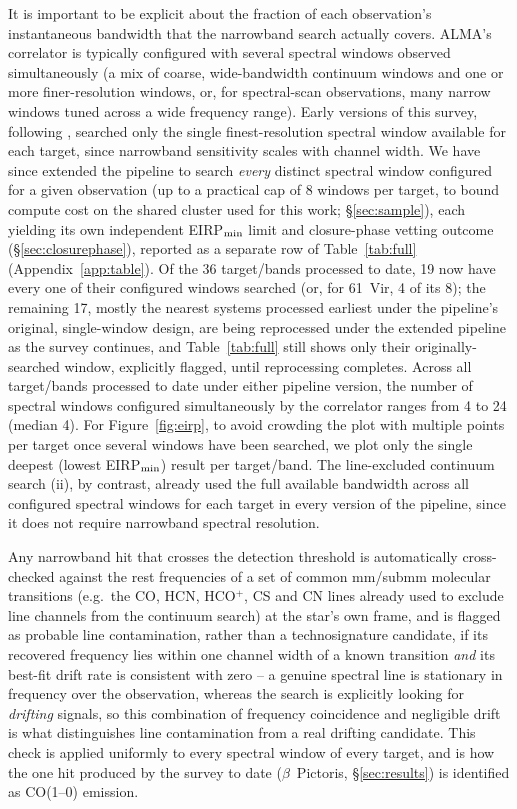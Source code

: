 \documentclass{openjournal}
\begin{document}
It is important to be explicit about the fraction of each observation's
instantaneous bandwidth that the narrowband search actually covers.
ALMA's correlator is typically configured with several spectral windows
observed simultaneously (a mix of coarse, wide-bandwidth continuum
windows and one or more finer-resolution windows, or, for spectral-scan
observations, many narrow windows tuned across a wide frequency range).
Early versions of this survey, following \citet{Mason2024}, searched
only the single finest-resolution spectral window available for each
target, since narrowband sensitivity scales with channel width. We have
since extended the pipeline to search \emph{every} distinct spectral
window configured for a given observation (up to a practical cap of 8
windows per target, to bound compute cost on the shared cluster used for
this work; \S\ref{sec:sample}), each yielding its own independent
EIRP$_{\rm min}$ limit and closure-phase vetting outcome
(\S\ref{sec:closurephase}), reported as a separate row of
Table~\ref{tab:full} (Appendix~\ref{app:table}). Of the 36 target/bands
processed to date, 19 now have every one of their configured windows
searched (or, for 61~Vir, 4 of its 8); the remaining 17, mostly the
nearest systems processed earliest under the pipeline's original,
single-window design, are being reprocessed under the extended pipeline
as the survey continues, and Table~\ref{tab:full} still shows only their
originally-searched window, explicitly flagged, until reprocessing
completes. Across all target/bands
processed to date under either pipeline version, the number of spectral
windows configured simultaneously by the correlator ranges from 4 to 24
(median 4). For Figure~\ref{fig:eirp}, to avoid crowding the plot with
multiple points per target once several windows have been searched, we
plot only the single deepest (lowest EIRP$_{\rm min}$) result per
target/band. The line-excluded continuum search (ii), by contrast,
already used the full available bandwidth across all configured spectral
windows for each target in every version of the pipeline, since it does
not require narrowband spectral resolution.

Any narrowband hit that crosses the detection threshold is automatically
cross-checked against the rest frequencies of a set of common mm/submm
molecular transitions (e.g.\ the CO, HCN, HCO$^{+}$, CS and CN lines
already used to exclude line channels from the continuum search) at the
star's own frame, and is flagged as probable line contamination, rather
than a technosignature candidate, if its recovered frequency lies within
one channel width of a known transition \emph{and} its best-fit drift
rate is consistent with zero -- a genuine spectral line is stationary in
frequency over the observation, whereas the search is explicitly looking
for \emph{drifting} signals, so this combination of frequency
coincidence and negligible drift is what distinguishes line
contamination from a real drifting candidate. This check is applied
uniformly to every spectral window of every target, and is how the one
hit produced by the survey to date ($\beta$~Pictoris, \S\ref{sec:results})
is identified as CO(1--0) emission.
\end{document}

